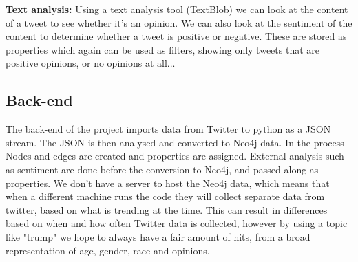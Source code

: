 \documentclass[11pt]{article}
\begin{document}
\textbf{Text analysis:} Using a text analysis tool (TextBlob) we can look at the content of a tweet to see whether it's an opinion. We can also look at the sentiment of the content to determine whether a tweet is positive or negative. These are stored as properties which again can be used as filters, showing only tweets that are positive opinions, or no opinions at all...

\subsection{Back-end}
The back-end of the project imports data from Twitter to python as a JSON stream. The JSON is then analysed and converted to Neo4j data. In the process Nodes and edges are created and properties are assigned. External analysis such as sentiment are done before the conversion to Neo4j, and passed along as properties.
We don't have a server to host the Neo4j data, which means that when a different machine runs the code they will collect separate data from twitter, based on what is trending at the time. This can result in differences based on when and how often Twitter data is collected, however by using a topic like "trump" we hope to always have a fair amount of hits, from a broad representation of age, gender, race and opinions.\newline
\end{document}
